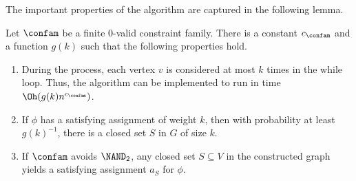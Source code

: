 %
The important properties of the algorithm are captured in the following lemma.
\begin{lem}\label{lem:randprop}
Let $\confam$ be a finite $0$-valid constraint family. There is a constant $c_\confam$ and a function $g(k)$ such that the following properties hold.
\begin{enumerate}[label=(P\arabic*)]
\item\label{item:iters} During the process, each vertex $v$ is considered at most $k$ times in the while loop. Thus, the algorithm can be implemented to run in time $\Oh(g(k)n^{c_\confam})$.
\item\label{item:satisclosedwhp} If $\phi$ has a satisfying assignment of weight $k$, then with probability at least $g(k)^{-1}$, there is a closed set $S$ in $G$ of size $k$.
\item\label{item:closedissat} If $\confam$ avoids $\NAND_2$, any closed set $S\subseteq V$ in the constructed graph yields a satisfying assignment $a_S$ for $\phi$. 
\end{enumerate}
\end{lem}
